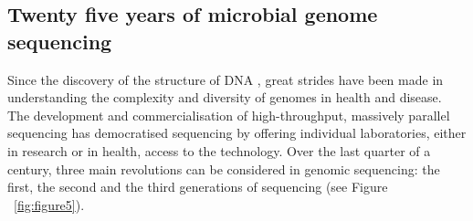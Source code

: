 \subsection{Twenty five years of microbial genome sequencing} \label{ssec:_intro_sequencing}

Since the discovery of the structure of \ac{DNA} \citep{watson_molecular_1953}, great strides have been made in understanding the complexity and diversity of genomes in health and disease. 
The development and commercialisation of high-throughput, massively parallel sequencing has democratised sequencing by offering individual laboratories, either in research or in health, access to the technology. 
Over the last quarter of a century, three main revolutions can be considered in genomic sequencing: the first, the second and the third generations of sequencing (see Figure ~\ref{fig:figure5}).

